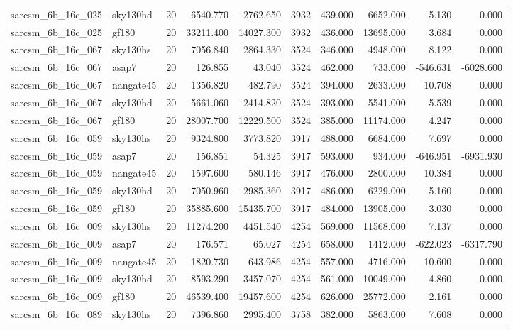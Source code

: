 \documentclass{article}
\begin{document}
\begin{longtable}{llrrrrrrrr}
sarcsm\_6b\_16c\_025 & sky130hd & 20 & 6540.770 & 2762.650 & 3932 & 439.000 & 6652.000 & 5.130 & 0.000 \\
sarcsm\_6b\_16c\_025 & gf180 & 20 & 33211.400 & 14027.300 & 3932 & 436.000 & 13695.000 & 3.684 & 0.000 \\
sarcsm\_6b\_16c\_067 & sky130hs & 20 & 7056.840 & 2864.330 & 3524 & 346.000 & 4948.000 & 8.122 & 0.000 \\
sarcsm\_6b\_16c\_067 & asap7 & 20 & 126.855 & 43.040 & 3524 & 462.000 & 733.000 & -546.631 & -6028.600 \\
sarcsm\_6b\_16c\_067 & nangate45 & 20 & 1356.820 & 482.790 & 3524 & 394.000 & 2633.000 & 10.708 & 0.000 \\
sarcsm\_6b\_16c\_067 & sky130hd & 20 & 5661.060 & 2414.820 & 3524 & 393.000 & 5541.000 & 5.539 & 0.000 \\
sarcsm\_6b\_16c\_067 & gf180 & 20 & 28007.700 & 12229.500 & 3524 & 385.000 & 11174.000 & 4.247 & 0.000 \\
sarcsm\_6b\_16c\_059 & sky130hs & 20 & 9324.800 & 3773.820 & 3917 & 488.000 & 6684.000 & 7.697 & 0.000 \\
sarcsm\_6b\_16c\_059 & asap7 & 20 & 156.851 & 54.325 & 3917 & 593.000 & 934.000 & -646.951 & -6931.930 \\
sarcsm\_6b\_16c\_059 & nangate45 & 20 & 1597.600 & 580.146 & 3917 & 476.000 & 2800.000 & 10.384 & 0.000 \\
sarcsm\_6b\_16c\_059 & sky130hd & 20 & 7050.960 & 2985.360 & 3917 & 486.000 & 6229.000 & 5.160 & 0.000 \\
sarcsm\_6b\_16c\_059 & gf180 & 20 & 35885.600 & 15435.700 & 3917 & 484.000 & 13905.000 & 3.030 & 0.000 \\
sarcsm\_6b\_16c\_009 & sky130hs & 20 & 11274.200 & 4451.540 & 4254 & 569.000 & 11568.000 & 7.137 & 0.000 \\
sarcsm\_6b\_16c\_009 & asap7 & 20 & 176.571 & 65.027 & 4254 & 658.000 & 1412.000 & -622.023 & -6317.790 \\
sarcsm\_6b\_16c\_009 & nangate45 & 20 & 1820.730 & 643.986 & 4254 & 557.000 & 4716.000 & 10.600 & 0.000 \\
sarcsm\_6b\_16c\_009 & sky130hd & 20 & 8593.290 & 3457.070 & 4254 & 561.000 & 10049.000 & 4.860 & 0.000 \\
sarcsm\_6b\_16c\_009 & gf180 & 20 & 46539.400 & 19457.600 & 4254 & 626.000 & 25772.000 & 2.161 & 0.000 \\
sarcsm\_6b\_16c\_089 & sky130hs & 20 & 7396.860 & 2995.400 & 3758 & 382.000 & 5863.000 & 7.608 & 0.000 \\

\end{longtable}
\end{document}
